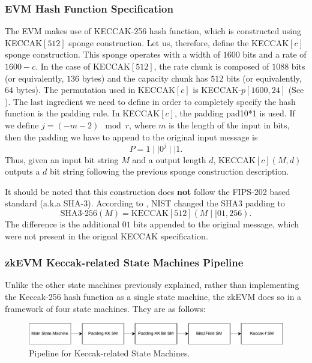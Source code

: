 \subsubsection*{EVM Hash Function Specification}

The EVM makes use of KECCAK-256 hash function, which is constructed using KECCAK$[512]$ sponge construction. Let us, therefore, define the KECCAK$[c]$ sponge construction. This sponge operates with a width of $1600$ bits and a rate of $1600 - c$. In the case of KECCAK$[512]$, the rate chunk is composed of $1088$ bits (or equivalently, $136$ bytes) and the capacity chunk has $512$ bits (or equivalently, $64$ bytes). The permutation used in KECCAK$[c]$ is KECCAK-$p[1600, 24]$ (See \cite{bertoni2013keccak}). The last ingredient we need to define in order to completely specify the hash function is the padding rule. In KECCAK$[c]$, the padding pad10*1 is used. If we define $j = (-m-2) \mod{r}$, where $m$ is the length of the input in bits, then the padding we have to append to the original input message is 
\[
P = 1 \mid\mid 0^j \mid\mid 1.
\]
Thus, given an input bit string $M$ and a output length $d$, KECCAK$[c](M, d)$ outputs a $d$ bit string following the previous sponge construction description. 

It should be noted that this construction does \textbf{not} follow the FIPS-202 based standard (a.k.a SHA-3). According to \cite{sha3standard}, NIST changed the SHA3 padding to
\[
\text{SHA3-256}(M) = \text{KECCAK}[512](M \mid\mid 01, 256).
\]
The difference is the additional $01$ bits appended to the original message, which were not present in the orignal KECCAK specification. 


\subsubsection*{zkEVM Keccak-related State Machines Pipeline}

Unlike the other state machines previously explained, rather than implementing the Keccak-256 hash function as a single state machine, the zkEVM does so in a framework of four state machines. They are as follows:

\vspace{3mm}
\begin{figure}[H]
    \centering
    \includegraphics[width=0.9\columnwidth]{../figures/keccak-sm.drawio}
    \caption{Pipeline for Keccak-related State Machines.}
    \label{fig:keccak-sm}
\end{figure}

